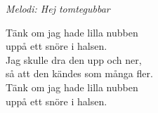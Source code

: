 {\footnotesize\textit{Melodi: Hej tomtegubbar}}\par
\vspace{10pt}
\revrpt Tänk om jag hade lilla nubben\\
uppå ett snöre i halsen.\rpt\\
Jag skulle dra den upp och ner,\\
så att den kändes som många fler.\\
Tänk om jag hade lilla nubben\\
uppå ett snöre i halsen.

